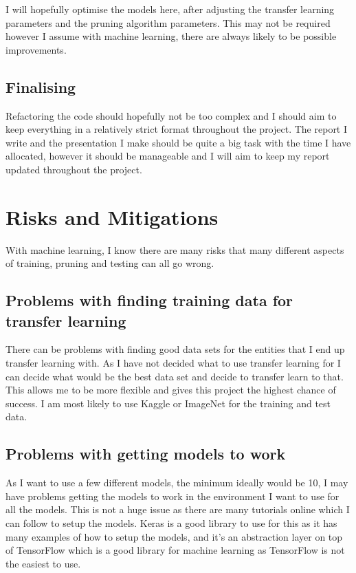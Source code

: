 \documentclass{article}
\begin{document}
I will hopefully optimise the models here, after adjusting the transfer learning parameters and the pruning algorithm parameters. This may not be required however I assume with machine learning, there are always likely to be possible improvements.

\subsection{Finalising}

Refactoring the code should hopefully not be too complex and I should aim to keep everything in a relatively strict format throughout the project. The report I write and the presentation I make should be quite a big task with the time I have allocated, however it should be manageable and I will aim to keep my report updated throughout the project.

\pagebreak
\section{Risks and Mitigations}
With machine learning, I know there are many risks that many different aspects of training, pruning and testing can all go wrong.

\subsection{Problems with finding training data for transfer learning}
There can be problems with finding good data sets for the entities that I end up transfer learning with. 
As I have not decided what to use transfer learning for I can decide what would be the best data 
set and decide to transfer learn to that. This allows me to be more flexible and gives this project the 
highest chance of success. I am most likely to use Kaggle or ImageNet\cite{ImageNet} for the training and test data.


\subsection{Problems with getting models to work}
As I want to use a few different models, the minimum ideally would be 10, I may have 
problems getting the models to work in the environment I want to use for all the models. 
This is not a huge issue as there are many tutorials online which I can follow to setup the models.
Keras is a good library to use for this as it has many examples of how to setup the models,
and it's an abstraction layer on top of TensorFlow\cite{TensorFlow} which is a good library for machine learning
as TensorFlow is not the easiest to use.
\end{document}

